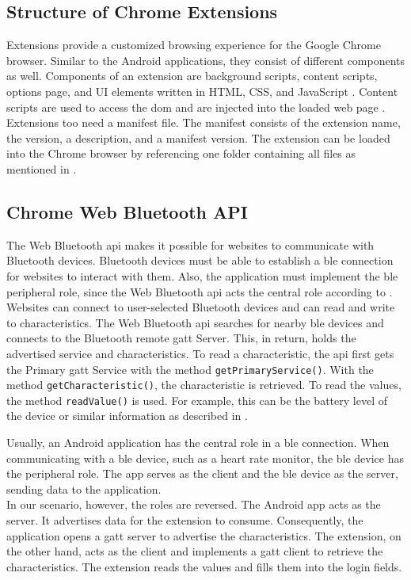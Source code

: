 \subsection{Structure of Chrome Extensions}
Extensions provide a customized browsing experience for the Google Chrome browser. Similar to the Android applications, they consist of different components as well. Components of an extension are background scripts, content scripts, options page, and UI elements written in HTML, CSS, and JavaScript \cite{Extensions}. Content scripts are used to access the \gls{dom} and are injected into the loaded web page \cite{LiuZYC12}. \\
Extensions too need a manifest file. The manifest consists of the extension name, the version, a description, and a manifest version. The extension can be loaded into the Chrome browser by referencing one folder containing all files as mentioned in \cite{Extensions}.


\subsection{Chrome Web Bluetooth API}
The Web Bluetooth \gls{api} makes it possible for websites to communicate with Bluetooth devices. Bluetooth devices must be able to establish a \gls{ble} connection for websites to interact with them. Also, the application must implement the \gls{ble} peripheral role, since the Web Bluetooth \gls{api} acts the central role according to \cite{BTAPIMozilla}. \\
Websites can connect to user-selected Bluetooth devices and can read and write to characteristics. The Web Bluetooth \gls{api} searches for nearby \gls{ble} devices and connects to the Bluetooth remote \gls{gatt} Server. This, in return, holds the advertised service and characteristics. To read a characteristic, the \gls{api} first gets the Primary \gls{gatt} Service with the method \texttt{getPrimaryService()}. With the method \texttt{getCharacteristic()}, the characteristic is retrieved. To read the values, the method \texttt{readValue()} is used. For example, this can be the battery level of the device or similar information as described in \cite{WebBTAPI}.

Usually, an Android application has the central role in a \gls{ble} connection. When communicating with a \gls{ble} device, such as a heart rate monitor, the \gls{ble} device has the peripheral role. The app serves as the client and the \gls{ble} device as the server, sending data to the application. \\
In our scenario, however, the roles are reversed. The Android app acts as the server. It advertises data for the extension to consume. Consequently, the application opens a \gls{gatt} server to advertise the characteristics. The extension, on the other hand, acts as the client and implements a \gls{gatt} client to retrieve the characteristics. The extension reads the values and fills them into the login fields. \\